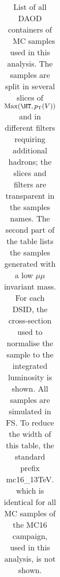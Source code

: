\begin{table}[htbp]
{\begin{tabular}{l|r}
\bottomrule
\end{tabular}}
  \caption{
    List of all DAOD containers of \Zmm\ \sherpa\ MC samples used in this analysis.
    The samples are split in several slices of $\mathrm{Max}(\HT,\pT(V))$ and in different filters requiring additional hadrons;
    the slices and filters are transparent in the samples names.
    The second part of the table lists the samples generated with a low $\mu\mu$ invariant mass.
    For each DSID, the cross-section used to normalise the sample to the integrated luminosity is shown.
    All samples are simulated in FS.
    To reduce the width of this table, the standard prefix \textsf{mc16\_13TeV.} which is identical for all MC samples of the MC16 campaign, used in this analysis, is not shown.
  }
  \label{tab:MC_samples_Zmumu}
\end{table}



